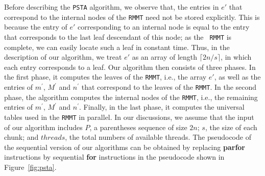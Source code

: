Before describing the {\tt PSTA} algorithm, we observe
that, the entries in $e'$ that correspond to the internal nodes of the
{\tt RMMT} need not be stored explicitly.  This is because the entry
of $e'$ corresponding to an internal node is equal to the entry that
corresponds to the last leaf descendant of this node; as the {\tt
  RMMT} is complete, we can easily locate such a leaf in constant
time.  Thus, in the description of our algorithm, we treat $e'$ as an
array of length $\lceil 2n / s\rceil$, in which each entry corresponds
to a leaf.  Our algorithm then consists of three phases. In the first
phase, it computes the leaves of the {\tt RMMT}, i.e., the array $e'$,
as well as the entries of $m^{\prime}$, $M^{\prime}$ and $n^{\prime}$
that correspond to the leaves of the {\tt RMMT}.  In the second phase,
the algorithm computes the internal nodes of the {\tt RMMT}, i.e., the
remaining entries of $m^{\prime}$, $M^{\prime}$ and $n^{\prime}$.
Finally, in the last phase, it computes the universal tables used in
the {\tt RMMT} in parallel.  In our discussions, we assume that the
input of our algorithm includes $P$, a parentheses sequence of size
$2n$; $s$, the size of each chunk; and $threads$, the total numbers of
available threads.  The pseudocode of the sequential version of our
algorithms can be obtained by replacing {\bf parfor} instructions by
sequential {\bf for} instructions in the pseudocode shown in
Figure~\ref{fig:psta}.

